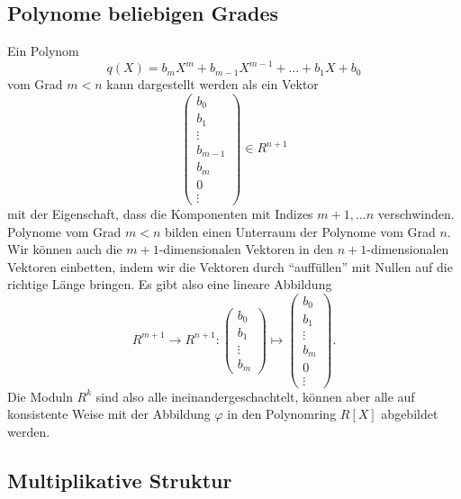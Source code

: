 \subsection{Polynome beliebigen Grades
\label{buch:subsection:polynome:beliebigergrad}}
Ein Polynom
\[
q(X)
=
b_mX^m + b_{m-1}X^{m-1} + \dots + b_1X + b_0
\]
vom Grad $m<n$ kann dargestellt werden als ein Vektor
\[
\begin{pmatrix}
b_0\\
b_1\\
\vdots\\
b_{m-1}\\
b_{m}\\
0\\
\vdots
\end{pmatrix}
\in
R^{n+1}
\]
mit der Eigenschaft, dass die Komponenten mit Indizes
$m+1,\dots n$ verschwinden.
Polynome vom Grad $m<n$ bilden einen Unterraum der Polynome vom Grad $n$.
Wir können auch die $m+1$-dimensionalen Vektoren in den $n+1$-dimensionalen
Vektoren einbetten, indem wir die Vektoren durch ``auffüllen'' mit Nullen
auf die richtige Länge bringen.
Es gibt also eine lineare Abbildung
\[
R^{m+1} \to R^{n+1}
\colon
\begin{pmatrix}
b_0\\b_1\\\vdots\\b_m
\end{pmatrix}
\mapsto
\begin{pmatrix}
b_0\\b_1\\\vdots\\b_m\\0\\\vdots
\end{pmatrix}
.
\]
Die Moduln $R^{k}$ sind also alle ineinandergeschachtelt, können aber
alle auf konsistente Weise mit der Abbildung $\varphi$ in den Polynomring
$R[X]$ abgebildet werden.
\begin{center}
\end{center}
\subsection{Multiplikative Struktur
\label{buch:subsection:polynome:multiplikativestruktur}}





